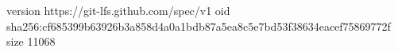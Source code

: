 version https://git-lfs.github.com/spec/v1
oid sha256:cf685399b63926b3a858d4a0a1bdb87a5ea8c5e7bd53f38634eacef75869772f
size 11068
